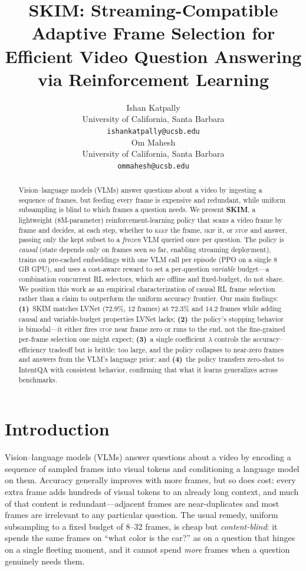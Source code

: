 \documentclass{article}
\title{SKIM: Streaming-Compatible Adaptive Frame Selection for Efficient Video Question Answering via Reinforcement Learning}
\author{%
  Ishan Katpally \\
  University of California, Santa Barbara \\
  \texttt{ishankatpally@ucsb.edu} \\
  \And
  Om Mahesh \\
  University of California, Santa Barbara \\
  \texttt{ommahesh@ucsb.edu} \\
}
\begin{document}
\maketitle

\begin{abstract}
Vision--language models (VLMs) answer questions about a video by ingesting a sequence
of frames, but feeding every frame is expensive and redundant, while uniform subsampling
is blind to which frames a question needs. We present \textbf{SKIM}, a lightweight
($8$M-parameter) reinforcement-learning policy that scans a video frame by frame and
decides, at each step, whether to \textsc{keep} the frame, \textsc{skip} it, or
\textsc{stop} and answer, passing only the kept subset to a \emph{frozen} VLM queried
once per question. The policy is \emph{causal} (state depends only on frames seen so
far, enabling streaming deployment), trains on pre-cached embeddings with one VLM call
per episode (PPO on a single $8$\,GB GPU), and uses a cost-aware reward to set a
per-question \emph{variable} budget---a combination concurrent RL selectors, which are
offline and fixed-budget, do not share. We position this work as an empirical
characterization of causal RL frame selection rather than a claim to outperform the
uniform accuracy frontier. Our main findings: \textbf{(1)}~SKIM matches LVNet ($72.9\%$,
$12$ frames) at $72.3\%$ and $14.2$ frames while adding causal and variable-budget
properties LVNet lacks; \textbf{(2)}~the policy's stopping behavior is bimodal---it
either fires \textsc{stop} near frame zero or runs to the end, not the fine-grained
per-frame selection one might expect; \textbf{(3)}~a single coefficient $\lambda$
controls the accuracy--efficiency tradeoff but is brittle: too large, and the policy
collapses to near-zero frames and answers from the VLM's language prior; and
\textbf{(4)}~the policy transfers zero-shot to IntentQA with consistent behavior,
confirming that what it learns generalizes across benchmarks.
\end{abstract}

\section{Introduction}
\label{sec:intro}
Vision--language models (VLMs) answer questions about a video by encoding a
sequence of sampled frames into visual tokens and conditioning a language model on
them. Accuracy generally improves with more frames, but so does cost: every extra
frame adds hundreds of visual tokens to an already long context, and much of that
content is redundant---adjacent frames are near-duplicates and most frames are
irrelevant to any particular question. The usual remedy, uniform subsampling to a
fixed budget of 8--32 frames, is cheap but \emph{content-blind}: it spends the same
frames on ``what color is the car?'' as on a question that hinges on a single
fleeting moment, and it cannot spend \emph{more} frames when a question genuinely
needs them.
\end{document}
